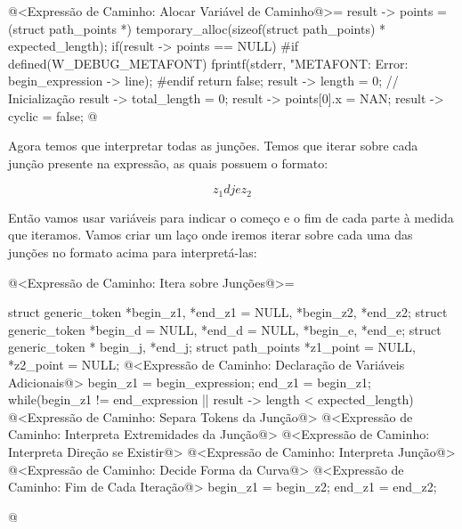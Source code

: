 \iniciocodigo
@<Expressão de Caminho: Alocar Variável de Caminho@>=
result -> points = (struct path_points *)
                     temporary_alloc(sizeof(struct path_points) *
                     expected_length);
if(result -> points == NULL){
#if defined(W_DEBUG_METAFONT)
  fprintf(stderr, "METAFONT: Error: %
          begin_expression -> line);
#endif
    return false;
}
result -> length = 0; // Inicialização
result -> total_length = 0;
result -> points[0].x = NAN;
result -> cyclic = false;
@
\fimcodigo

Agora temos que interpretar todas as junções. Temos que iterar sobre
cada junção presente na expressão, as quais possuem o formato:

$$
z_1{d} j {e}z_2
$$

Então vamos usar variáveis para indicar o começo e o fim de cada parte
à medida que iteramos. Vamos criar um laço onde iremos iterar sobre
cada uma das junções no formato acima para interpretá-las:

\iniciocodigo
@<Expressão de Caminho: Itera sobre Junções@>=
{
  struct generic_token *begin_z1, *end_z1 = NULL, *begin_z2, *end_z2;
  struct generic_token *begin_d = NULL, *end_d = NULL, *begin_e, *end_e;
  struct generic_token * begin_j, *end_j;
  struct path_points *z1_point = NULL, *z2_point = NULL;
  @<Expressão de Caminho: Declaração de Variáveis Adicionais@>
  begin_z1 = begin_expression;
  end_z1 = begin_z1;
  while(begin_z1 != end_expression || result -> length < expected_length){
    @<Expressão de Caminho: Separa Tokens da Junção@>
    @<Expressão de Caminho: Interpreta Extremidades da Junção@>
    @<Expressão de Caminho: Interpreta Direção se Existir@>
    @<Expressão de Caminho: Interpreta Junção@>
    @<Expressão de Caminho: Decide Forma da Curva@>
    @<Expressão de Caminho: Fim de Cada Iteração@>
    begin_z1 = begin_z2;
    end_z1 = end_z2;
  }
  
}
@
\fimcodigo


